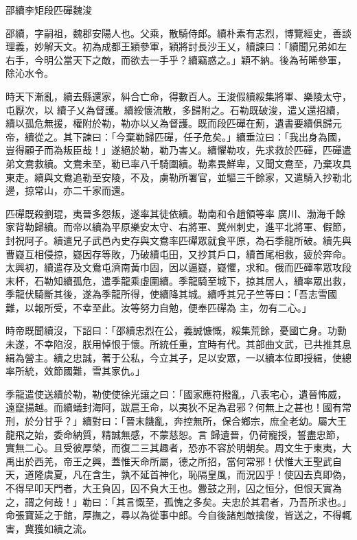 
\begin{pinyinscope}
邵續李矩段匹磾魏浚



 邵續，字嗣祖，魏郡安陽人也。父乘，散騎侍郎。續朴素有志烈，博覽經史，善談理義，妙解天文。初為成都王穎參軍，穎將討長沙王乂，續諫曰：「續聞兄弟如左右手，今明公當天下之敵，而欲去一手乎？續竊惑之。」穎不納。後為茍晞參軍，除沁水令。



 時天下漸亂，續去縣還家，糾合亡命，得數百人。王浚假續綏集將軍、樂陵太守，屯厭次，以
 續子乂為督護。續綏懷流散，多歸附之。石勒既破浚，遣乂還招續，續以孤危無援，權附於勒，勒亦以乂為督護。既而段匹磾在薊，遺書要續俱歸元帝，續從之。其下諫曰：「今棄勒歸匹磾，任子危矣。」續垂泣曰：「我出身為國，豈得顧子而為叛臣哉！」遂絕於勒，勒乃害乂。續懼勒攻，先求救於匹磾，匹磾遣弟文鴦救續。文鴦未至，勒已率八千騎圍續。勒素畏鮮卑，又聞文鴦至，乃棄攻具東走。續與文鴦追勒至安陵，不及，虜勒所署官，並驅三千餘家，又遣騎入抄勒北邊，掠常山，亦二千家而還。



 匹磾既殺劉琨，夷晉多怨叛，遂率其徒依續。勒南和令趙領等率
 廣川、渤海千餘家背勒歸續。而帝以續為平原樂安太守、右將軍、冀州刺史，進平北將軍、假節，封祝阿子。續遣兄子武邑內史存與文鴦率匹磾眾就食平原，為石季龍所破。續先與曹嶷互相侵掠，嶷因存等敗，乃破續屯田，又抄其戶口，續首尾相救，疲於奔命。太興初，續遣存及文鴦屯濟南黃巾固，因以逼嶷，嶷懼，求和。俄而匹磾率眾攻段末杯，石勒知續孤危，遣季龍乘虛圍續。季龍騎至城下，掠其居人，續率眾出救，季龍伏騎斷其後，遂為季龍所得，使續降其城。續呼其兄子竺等曰：「吾志雪國難，以報所受，不幸至此。汝等努力自勉，便奉匹磾為
 主，勿有二心。」



 時帝既聞續沒，下詔曰：「邵續忠烈在公，義誠慷慨，綏集荒餘，憂國亡身。功勳未遂，不幸陷沒，朕用悼恨于懷。所統任重，宜時有代。其部曲文武，已共推其息緝為營主。續之忠誠，著于公私，今立其子，足以安眾，一以續本位即授緝，使總率所統，效節國難，雪其家仇。」



 季龍遣使送續於勒，勒使使徐光讓之曰：「國家應符撥亂，八表宅心，遺晉怖威，遠竄揚越。而續蟻封海阿，跋扈王命，以夷狄不足為君邪？何無上之甚也！國有常刑，於分甘乎？」續對曰：「晉末饑亂，奔控無所，保合鄉宗，庶全老幼。屬大王龍飛之始，委命納質，精誠無感，不蒙慈恕。言
 歸遺晉，仍荷寵授，誓盡忠節，實無二心。且受彼厚榮，而復二三其趣者，恐亦不容於明朝矣。周文生于東夷，大禹出於西羌，帝王之興，蓋惟天命所屬，德之所招，當何常邪！伏惟大王聖武自天，道隆虞夏，凡在含生，孰不延首神化，恥隔皇風，而況囚乎！使囚去真即偽，不得早叩天門者，大王負囚，囚不負大王也。釁鼓之刑，囚之恒分，但恨天實為之，謂之何哉！」勒曰：「其言慨至，孤愧之多矣。夫忠於其君者，乃吾所求也。」命張寶延之于館，厚撫之，尋以為從事中郎。今自後諸剋敵擒俊，皆送之，不得輒害，冀獲如續之流。




\end{pinyinscope}
